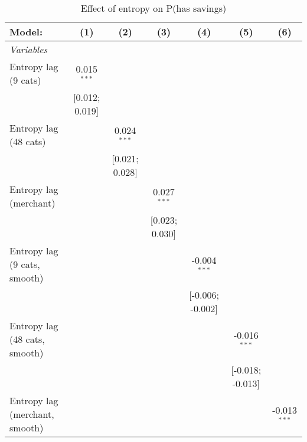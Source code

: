 
\begin{table}[htbp]
   \centering
   \tiny
   \begin{threeparttable}[b]
      \caption{\label{tab:reg_has_inflows_lag} Effect of entropy on P(has savings)}
      \begin{tabular}{lcccccc}
         \tabularnewline \midrule \midrule
         Model:                         & (1)             & (2)             & (3)             & (4)              & (5)              & (6)\\  
         \midrule
         \emph{Variables}\\
         Entropy lag (9 cats)           & 0.015$^{***}$   &                 &                 &                  &                  &   \\   
                                        & [0.012; 0.019]  &                 &                 &                  &                  &   \\   
         Entropy lag (48 cats)          &                 & 0.024$^{***}$   &                 &                  &                  &   \\   
                                        &                 & [0.021; 0.028]  &                 &                  &                  &   \\   
         Entropy lag (merchant)         &                 &                 & 0.027$^{***}$   &                  &                  &   \\   
                                        &                 &                 & [0.023; 0.030]  &                  &                  &   \\   
         Entropy lag (9 cats, smooth)   &                 &                 &                 & -0.004$^{***}$   &                  &   \\   
                                        &                 &                 &                 & [-0.006; -0.002] &                  &   \\   
         Entropy lag (48 cats, smooth)  &                 &                 &                 &                  & -0.016$^{***}$   &   \\   
                                        &                 &                 &                 &                  & [-0.018; -0.013] &   \\   
         Entropy lag (merchant, smooth) &                 &                 &                 &                  &                  & -0.013$^{***}$\\   

\end{tabular}
\end{threeparttable}
\end{table}

